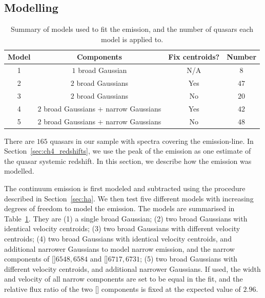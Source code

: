 \subsection{Modelling \hans}
\label{sec:hamodel}

\begin{table}
  \centering
  \footnotesize 
    \begin{tabular}{cccc} 
    \hline
    Model     & Components & Fix centroids? & Number \\
    \hline
    1        & $1$ broad Gaussian  & N/A &  $8$ \\
    2        & $2$ broad Gaussians & Yes &  $47$ \\
    3        & $2$ broad Gaussians & No  &  $20$ \\
    4        & $2$ broad Gaussians + narrow Gaussians & Yes & $42$ \\
    5        & $2$ broad Gaussians + narrow Gaussians & No  & $48$ \\
    \hline
    \end{tabular}
    \caption[{Summary of models used to fit the \ha emission, and the number of quasars each model is applied to.}]{Summary of models used to fit the \ha emission, and the number of quasars each model is applied to.}
  \label{tab:hamod}
\end{table} 

There are $165$ quasars in our sample with spectra covering the \ha emission-line. 
In Section~\ref{sec:ch4_redshifts}, we use the peak of the \ha emission as one estimate of the quasar systemic redshift. 
In this section, we describe how the \ha emission was modelled. 

The continuum emission is first modeled and subtracted using the procedure described in Section~\ref{sec:ha}. 
We then test five different models with increasing degrees of freedom to model the \ha emission. 
The models are summarised in Table~\ref{tab:hamod}. 
They are (1) a single broad Gaussian; (2) two broad Gaussians with identical velocity centroids; (3) two broad Gaussians with different velocity centroids; (4) two broad Gaussians with identical velocity centroids, and additional narrower Gaussians to model narrow \ha emission, and the narrow components of []\ll$6548,6584$ and []\ll$6717,6731$; (5) two broad Gaussians with different velocity centroids, and additional narrower Gaussians. 
If used, the width and velocity of all narrow components are set to be equal in the fit, and the relative flux ratio of the two [] components is fixed at the expected value of $2.96$.

